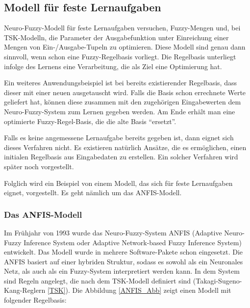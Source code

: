 \subsection{Modell f\"{u}r feste Lernaufgaben}

Neuro-Fuzzy-Modell für feste Lernaufgaben versuchen, Fuzzy-Mengen und, bei TSK-Modelln, die Parameter der Ausgabefunktion unter Einreichung einer Mengen von Ein-/Ausgabe-Tupeln zu optimieren. Diese Modell sind genau dann sinnvoll, wenn schon eine Fuzzy-Regelbasis vorliegt. Die Regelbasis unterliegt infolge des Lernens eine Verarbeitung, die als Ziel eine Optimierung hat. %

Ein weiteres Anwendungsbeispiel ist bei bereits existierender Regelbasis, dass dieser mit einer neuen ausgetauscht wird. Falls die Basis schon errechnete Werte geliefert hat, können diese zusammen mit den zugehörigen Eingabewerten dem Neuro-Fuzzy-System zum Lernen gegeben werden. Am Ende erhält man eine optimierte Fuzzy-Regel-Basis, die die alte Basis ``ersetzt''.

Falls es keine angemessene Lernaufgabe bereits gegeben ist, dann eignet sich dieses Verfahren nicht. Es existieren natürlich Ansätze, die es ermöglichen, einen initialen Regelbasis aus Eingabedaten zu erstellen. Ein solcher Verfahren wird später noch vorgestellt.

Folglich wird ein Beispiel von einem Modell, das sich für feste Lernaufgaben eignet, vorgestellt. Es geht nämlich um das ANFIS-Modell.

\subsubsection{Das ANFIS-Modell}\label{ANFIS}

Im Frühjahr von 1993 wurde das Neuro-Fuzzy-System ANFIS (Adaptive Neuro-Fuzzy Inference System oder Adaptive Network-based Fuzzy Inference System) entwickelt. Das Modell wurde in mehrere Software-Pakete schon eingesetzt. Die ANFIS basiert auf einer hybriden Struktur, sodass es sowohl als ein Neuronales Netz, als auch als ein Fuzzy-System interpretiert werden kann. In dem System sind Regeln angelegt, die nach dem TSK-Modell definiert sind (Takagi-Sugeno-Kang-Reglern \ref{TSK}). Die Abbildung \ref{ANFIS_Abb} zeigt einen Modell mit folgender Regelbasis:%

